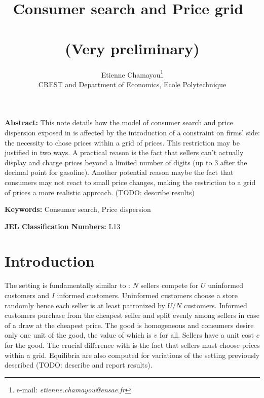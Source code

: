 \documentclass[11pt]{article}
\begin{document}
\title{Consumer search and Price grid\ \\ \ \\(Very preliminary)}
\author{Etienne Chamayou\thanks{e-mail:
\textit{etienne.chamayou@ensae.fr}}\medskip\\{\normalsize CREST and Department of Economics, Ecole Polytechnique }}
\maketitle

\sloppy%

\onehalfspacing

\textbf{Abstract:}
This note details how the model of consumer search and price dispersion exposed in \cite{VAR80} is affected by the introduction of a constraint on firms' side: the necessity to chose prices within a grid of prices. This restriction may be justified in two ways. A practical reason is the fact that sellers can't actually display and charge prices beyond a limited number of digits (up to 3 after the decimal point for gasoline). Another potential reason maybe the fact that consumers may not react to small price changes, making the restriction to a grid of prices a more realistic approach. (TODO: describe results)

\strut

\textbf{Keywords:} Consumer search, Price dispersion

\strut

\textbf{JEL Classification Numbers:} L13

\pagebreak%
\doublespacing

\section{Introduction}

The setting is fundamentally similar to \cite{VAR80}: $N$ sellers compete for $U$ uninformed customers and $I$ informed customers. Uninformed customers choose a store randomly hence each seller is at least patronized by $U/N$ customers. Informed customers purchase from the cheapest seller and split evenly among sellers in case of a draw at the cheapest price. The good is homogeneous and consumers desire only one unit of the good, the value of which is $v$ for all. Sellers have a unit cost $c$ for the good. The crucial difference with \cite{VAR80} is the fact that sellers must choose prices within a grid. Equilibria are also computed for variations of the setting previously described (TODO: describe and report results).
\end{document}
